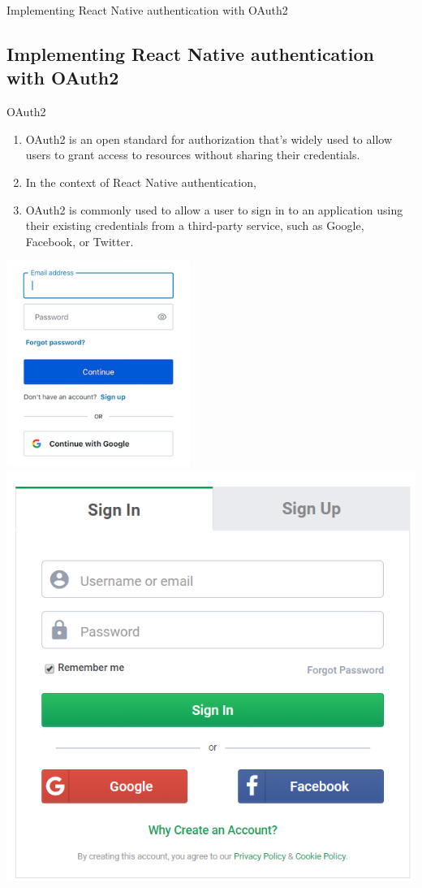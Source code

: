 \documentclass[10pt]{beamer}
\begin{document}
\begin{frame}{Implementing React Native authentication with OAuth2}
\subsection{Implementing React Native authentication with OAuth2}
\begin{block}{OAuth2}
\begin{enumerate}
\item[\ding{230}]OAuth2 is an open standard for authorization that's widely used to allow users to grant access to resources without sharing their credentials.
\item[\ding{230}]In the context of React Native authentication,
\item[\ding{230}]OAuth2 is commonly used to allow a user to sign in to an application using their existing credentials from a third-party service, such as Google, Facebook, or Twitter.
\end{enumerate}

\end{block}
\begin{center}
\includegraphics[scale=.2]{2.png}
\includegraphics[scale=.2]{1.png}
\end{center}

\end{frame}
\end{document}

